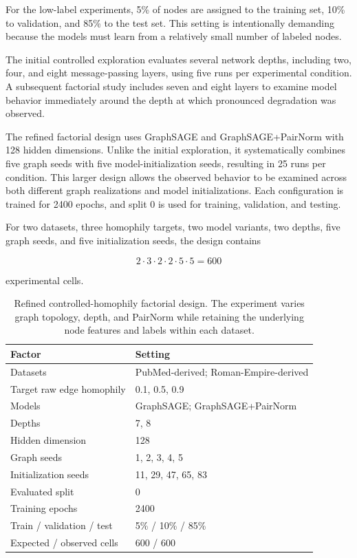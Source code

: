 \documentclass[english]{lni}
\begin{document}
For the low-label experiments, 5\% of nodes are assigned to the training set, 10\% to validation, and 85\% to the test set. This setting is intentionally demanding because the models must learn from a relatively small number of labeled nodes.

The initial controlled exploration evaluates several network depths, including two, four, and eight message-passing layers, using five runs per experimental condition. A subsequent factorial study includes seven and eight layers to examine model behavior immediately around the depth at which pronounced degradation was observed.

The refined factorial design uses GraphSAGE and GraphSAGE+PairNorm with 128 hidden dimensions. Unlike the initial exploration, it systematically combines five graph seeds with five model-initialization seeds, resulting in 25 runs per condition. This larger design allows the observed behavior to be examined across both different graph realizations and model initializations. Each configuration is trained for 2400 epochs, and split 0 is used for training, validation, and testing.

For two datasets, three homophily targets, two model variants, two depths, five graph seeds, and five initialization seeds, the design contains

\[
2\cdot3\cdot2\cdot2\cdot5\cdot5=600
\]

experimental cells.

\begin{table}[H]
\centering
\caption{Refined controlled-homophily factorial design. The experiment varies graph topology, depth, and PairNorm while retaining the underlying node features and labels within each dataset.}
\label{tab:controlled-design}
\small
\begin{tabular}{ll}
\toprule
Factor & Setting\\
\midrule
Datasets & PubMed-derived; Roman-Empire-derived\\
Target raw edge homophily & 0.1, 0.5, 0.9\\
Models & GraphSAGE; GraphSAGE+PairNorm\\
Depths & 7, 8\\
Hidden dimension & 128\\
Graph seeds & 1, 2, 3, 4, 5\\
Initialization seeds & 11, 29, 47, 65, 83\\
Evaluated split & 0\\
Training epochs & 2400\\
Train / validation / test & 5\% / 10\% / 85\%\\
Expected / observed cells & 600 / 600\\
\bottomrule
\end{tabular}
\end{table}
\end{document}
